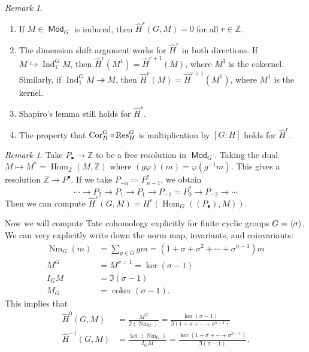 \documentclass[leqno, openany]{memoir}
\theoremstyle{definition}
\theoremstyle{remark}
\newtheorem{rmk}[thm]{Remark}
\theoremstyle{plain}
\theoremstyle{definition}
\theoremstyle{remark}
\newcommand{\Z}{\mathbb{Z}}
\newcommand{\wh}[1]{\widehat{#1}}
\DeclareMathOperator{\Hom}{Hom}
\DeclareMathOperator{\Mod}{\mathsf{Mod}}
\DeclareMathOperator{\Ind}{Ind}
\DeclareMathOperator{\Cor}{Cor}
\DeclareMathOperator{\Nm}{Nm}
\DeclareMathOperator{\coker}{coker}
\begin{document}
\begin{rmk}\leavevmode
    \begin{enumerate}
        \item If $M \in \Mod_G$ is induced, then $\wh{H}^r(G, M) = 0$ for all $r \in \Z$.
        \item The dimension shift argument works for $\wh{H}^r$ in both directions. If $M \hookrightarrow \Ind_1^G M$, then $\wh{H}^r(M^1) = \wh{H}^{r+1}(M)$, where $M^1$ is the cokernel. Similarly, if $\Ind_1^G M \twoheadrightarrow M$, then $\wh{H}^r(M) = \wh{H}^{r+1}(M^1)$, where $M^1$ is the kernel.
        \item Shapiro's lemma still holds for $\wh{H}^r$.
        \item The property that $\Cor_H^G \circ \Res_H^G$ is multiplication by $[G:H]$ holds for $\wh{H}^r$.
    \end{enumerate}
\end{rmk}

\begin{rmk}
    Take $P_{\bullet} \to \Z$ to be a free resolution in $\Mod_G$. Taking the dual $M \mapsto M^* = \Hom_{\Z}(M, \Z)$ where $(g \varphi)(m) = \varphi(g^{-1}m)$. This gives a resolution $\Z \to P^{\bullet}$. If we take $P_{-n} \coloneqq P_{n-1}^*$, we obtain
    \[ \cdots \to P_2 \to P_1 \to P_1 \to P_{-1} = P_0^* \to P_{-2} \to \cdots \]
    Then we can compute $\wh{H}^r(G, M) = H^r(\Hom_G({(P_{\bullet})}, M))$.
\end{rmk}

Now we will compute Tate cohomology explicitly for finite cyclic groups $G = \ev{\sigma}$. We can very explicitly write down the norm map, invariants, and coinvariants:
\begin{align*}
    \Nm_G(m) &= \sum_{g \in G} g m = (1 + \sigma + \sigma^2 + \cdots + \sigma^{n-1}) m \\
    M^G &= M^{\sigma = 1} = \ker (\sigma - 1) \\
    I_G M &= \Im (\sigma - 1) \\
    M_G &= \coker (\sigma - 1).
\end{align*}
This implies that 
\begin{align*}
    \wh{H}^0(G, M) &= \frac{M^G}{\Im (\Nm_G)} = \frac{\ker (\sigma - 1)}{\Im (1 + \sigma + \cdots + \sigma^{n-1})} \\
    \wh{H}^{-1}(G, M) &= \frac{\ker (\Nm_G)}{I_G M} = \frac{\ker (1+ \sigma + \cdots + \sigma^{n-1})}{\Im (\sigma - 1)}.
\end{align*}
\end{document}
